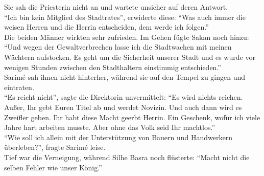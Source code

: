 Sie sah die Priesterin nicht an und wartete unsicher auf deren Antwort.\\
``Ich bin kein Mitglied des Stadtrates'', erwiderte diese: ``Was auch immer die weisen Herren und 
die Herrin entscheiden, dem werde ich folgen.''\\
Die beiden Männer wirkten sehr zufrieden. Im Gehen fügte Sakan noch hinzu: ``Und wegen der 
Gewaltverbrechen lasse ich die Stadtwachen mit meinen Wächtern aufstocken. Es geht um die 
Sicherheit unserer Stadt und es wurde vor wenigen Stunden zwischen den Stadthaltern einstimmig 
entschieden.''\\
Sarimé sah ihnen nicht hinterher, während sie auf den Tempel zu gingen und eintraten.\\
``Es reicht nicht'', sagte die Direktorin unvermittelt: ``Es wird nichts reichen. Außer, Ihr gebt 
Euren Titel ab und werdet Novizin. Und auch dann wird es Zweifler geben. Ihr habt diese Macht 
geerbt Herrin. Ein Geschenk, wofür ich viele Jahre hart arbeiten musste. Aber ohne das Volk seid 
Ihr machtlos.''\\
``Wie soll ich allein mit der Unterstützung von Bauern und Handwerkern überleben?'', fragte Sarimé 
leise.\\
Tief war die Verneigung, während Silhe Basra noch flüsterte: ``Macht nicht die selben Fehler wie 
unser König.''\\


